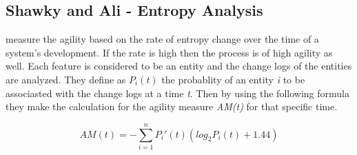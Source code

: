 \subsection{Shawky and Ali - Entropy Analysis}
\citet{entropy} measure the agility based on the rate of entropy change over the time of a system's development. If the rate is high then the process is of high agility as well. Each feature is considered to be an entity and the change logs of the entities are analyzed. They define as $P_i(t)$  the probablity of an entity \textit{i} to be associasted with the change logs at a time \textit{t}. Then by using the following formula they make the calculation for the agility measure \textit{AM(t)} for that specific time.

\begin{equation} AM(t) = - \sum_{i=1}^{n} P_i'(t) (log_2 P_i(t) + 1.44) \end{equation} 




